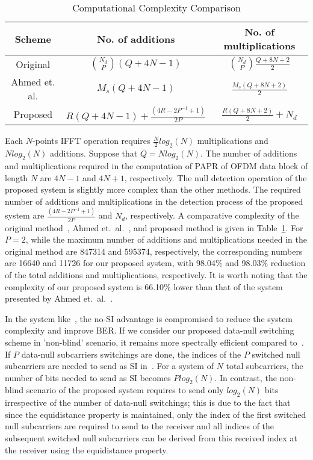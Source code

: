 \documentclass[journal,comsoc]{IEEEtran}
\begin{document}
   
\begin{table}[]
\centering
\caption{Computational Complexity Comparison}
\label{tabl2}
\begin{tabular}{|c|c|c|}
\hline
Scheme & No. of additions & No. of multiplications \\ \hline
Original & $N_d \choose P$$(Q+4N-1)$ & $N_d \choose P$$\frac{Q+8N+2}{2}$ \\ \hline
Ahmed et. al. & $M_s(Q+4N-1)$ & $\frac{M_s(Q+8N+2)}{2}$ \\ \hline
Proposed & $R(Q+4N-1)+\frac{(4R-2P^{-1}+1)}{2P}$ & $\frac{R(Q+8N+2)}{2}+N_d$ \\ \hline
\end{tabular}
\end{table}

    Each $N$-points IFFT operation requires $\frac{N}{2}log_2(N)$ multiplications and $Nlog_2(N)$ additions. Suppose that $Q=Nlog_2(N)$. The number of additions and multiplications required in the computation of PAPR of OFDM data block of length $N$ are $4N-1$ and $4N+1$, respectively. The null detection operation of the proposed system is slightly more complex than the other methods. The required number of additions and multiplications in the detection process of the proposed system are $\frac{(4R-2P^{-1}+1)}{2P}$ and $N_d$, respectively.  A comparative complexity of the original method~\cite{IEEEhowto:wong1}, Ahmed et.~al.~\cite{IEEEhowto:sabbir2}, and proposed method is given in Table~\ref{tabl2}. For $P=2$, while the maximum number of additions and multiplications needed in the original method are 847314 and 595374, respectively, the corresponding numbers are 16640 and 11726 for our proposed system, with 98.04\% and 98.03\% reduction of the total additions and multiplications, respectively. It is worth noting that the complexity of our proposed system is 66.10\% lower than that of the system presented by Ahmed et.~al.~\cite{IEEEhowto:sabbir2}.
    
    In the system like~\cite{IEEEhowto:wong2}, the no-SI advantage is compromised to reduce the system complexity and improve BER. If we consider our proposed data-null switching scheme in 'non-blind' scenario, it remains more spectrally efficient compared to~\cite{IEEEhowto:wong2}. If $P$ data-null subcarriers switchings are done, the indices of the $P$ switched null subcarriers are needed to send as SI in~\cite{IEEEhowto:wong2}. For a system of $N$ total subcarriers, the number of bits needed to send as SI becomes $Plog_2(N)$. In contrast, the non-blind scenario of the proposed system requires to send only $log_2(N)$ bits irrespective of the number of data-null switchings; this is due to the fact that since the equidistance property is maintained, only the index of the first switched null subcarriers are required to send to the receiver and all indices of the subsequent switched null subcarriers can be derived from this received index at the receiver using the equidistance property.
\end{document}
